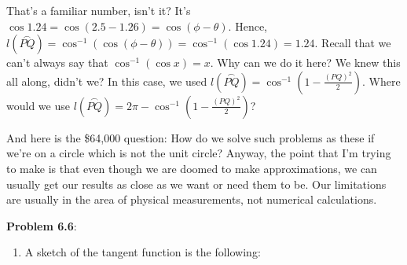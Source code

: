 \documentclass[english]{book}
\newcommand{\arc}[1]{\overset{\frown}{#1} }
\begin{document}
That's a familiar number, isn't it? It's $\cos 1.24 = \cos (2.5 - 1.26) = \cos (\phi - \theta)$. Hence, $l(\arc{PQ}) = \cos^{-1} (\cos (\phi - \theta)) = \cos^{-1} (\cos 1.24) = 1.24$. Recall that we can't always say that $\cos^{-1} (\cos x) = x$. Why can we do it here? We knew this all along, didn't we? In this case, we used $l(\arc{PQ}) = \cos^{-1} (1-\frac{(PQ)^{2}}{2})$. Where would we use $l(\arc{PQ}) = 2\pi - \cos^{-1} (1- \frac{(PQ)^{2}}{2})$? 

And here is the {\$}64,000 question: How do we solve such problems as these if we're on a circle which is not the unit circle? Anyway, the point that I'm trying to make is that even though we are doomed to make approximations, we can usually get our results as close as we want or need them to be. Our limitations are usually in the area of physical measurements, not numerical calculations.

\vspace{0.3cm}

\textbf{Problem 6.6}:
\begin{enumerate}
  \item[\hspace{1cm}a)] A sketch of the tangent function is the following:
\end{enumerate}
\end{document}
